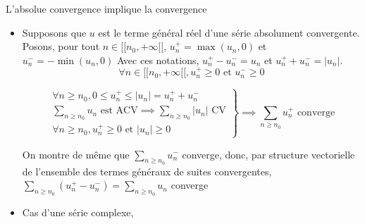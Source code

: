 \documentclass{article}
\renewenvironment{question_kholle}[2][ ]
{
	\subsection{\texorpdfstring{#2}{}}
	\notblank{#1}
	{
		\noindent #1
		\bigbreak
	}
	{}
	\begin{proof}
}
{
	\end{proof}
}
\begin{document}
\begin{question_kholle}[{Soit $u \in \K^{[ \! [ n_{0}, +\infty [ \![}$
  Si la série $\sum_{n\geqslant n_{0}}u_{n}$ est absolument convergente, alors la série $\sum_{n\geqslant n_{0}}u_{n}$ est convergente.}]{L'absolue convergence implique la convergence}



  \begin{itemize}[label=$\lozenge$]
    \item Supposons que $u$ est le terme général réel d'une série absolument convergente.
          Posons, pour tout $n \in [ \! [ n_{0}, +\infty [ \![$, $u_{n}^{+}= \max(u_{n}, 0)$ et $u_{n}^{-}=- \min (u_{n}, 0)$
          Avec ces notations, $u_{n}^{+}- u_{n}^{-} = u_{n}$ et $u_{n}^{+}+u_{n}^{-} = \lvert u_{n} \rvert$.
          $$
            \forall n \in [ \! [ n_{0}, +\infty [ \![, u_{n}^{+}\geqslant 0 \text{ et } u_{n}^{-}\geqslant 0
          $$

          $$
            \left. \begin{array}{ll}
              \forall n \geqslant n_{0}, 0\leqslant u_{n}^{+} \leqslant \lvert u_{n} \rvert = u_{n}^{+}+ u_{n}^{-}           \\
              \sum_{n\geqslant n_{0}} u_{n} \text{ est ACV} \implies \sum_{n\geqslant n_{0}} \lvert u_{n} \rvert  \text{ CV} \\
              \forall n \geqslant n_{0}, u_{n}^{+}\geqslant 0 \text{ et } \lvert u_{n} \rvert \geqslant 0
            \end{array}\right\}\implies \sum_{n\geqslant n_{0}}u_{n} ^{+}\text{ converge}
          $$

          On montre de même que $\sum_{n\geqslant n_{0}}u_{n}^{-}$ converge, donc, par structure vectorielle de l'ensemble des termes généraux de suites convergentes, $\sum_{ n\geqslant n_{0}}(u_{n}^{+} - u_{n}^{-})= \sum_{n\geqslant n_{0}}u_{n}$ converge

    \item Cas d'une série complexe,


\end{itemize}
\end{question_kholle}
\end{document}
